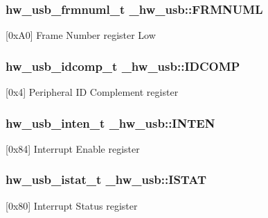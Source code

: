 \subsubsection[{\texorpdfstring{F\+R\+M\+N\+U\+ML}{FRMNUML}}]{ {\bf hw\+\_\+usb\+\_\+frmnuml\+\_\+t} \+\_\+hw\+\_\+usb\+::\+F\+R\+M\+N\+U\+ML}\hypertarget{struct__hw__usb_ab7e467e9bc4cf82fe11bf642236ff442}{}\label{struct__hw__usb_ab7e467e9bc4cf82fe11bf642236ff442}
\mbox{[}0x\+A0\mbox{]} Frame Number register Low 
\subsubsection[{\texorpdfstring{I\+D\+C\+O\+MP}{IDCOMP}}]{ {\bf hw\+\_\+usb\+\_\+idcomp\+\_\+t} \+\_\+hw\+\_\+usb\+::\+I\+D\+C\+O\+MP}\hypertarget{struct__hw__usb_a91ebe70e4196a719cd43ab1de52f30a6}{}\label{struct__hw__usb_a91ebe70e4196a719cd43ab1de52f30a6}
\mbox{[}0x4\mbox{]} Peripheral ID Complement register 
\subsubsection[{\texorpdfstring{I\+N\+T\+EN}{INTEN}}]{ {\bf hw\+\_\+usb\+\_\+inten\+\_\+t} \+\_\+hw\+\_\+usb\+::\+I\+N\+T\+EN}\hypertarget{struct__hw__usb_aa9a4d445ec7a9a5eeb557ab9e089f42f}{}\label{struct__hw__usb_aa9a4d445ec7a9a5eeb557ab9e089f42f}
\mbox{[}0x84\mbox{]} Interrupt Enable register 
\subsubsection[{\texorpdfstring{I\+S\+T\+AT}{ISTAT}}]{ {\bf hw\+\_\+usb\+\_\+istat\+\_\+t} \+\_\+hw\+\_\+usb\+::\+I\+S\+T\+AT}\hypertarget{struct__hw__usb_a39f3421e9970e93f3c61d2dbe6b0a51a}{}\label{struct__hw__usb_a39f3421e9970e93f3c61d2dbe6b0a51a}
\mbox{[}0x80\mbox{]} Interrupt Status register 
